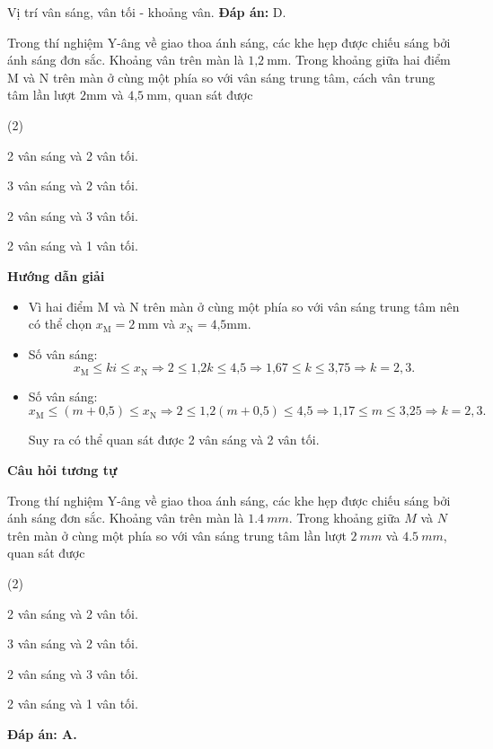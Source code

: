 \begin{dang}{Vị trí vân sáng, vân tối - khoảng vân.}
{	
	\textbf{Đáp án:} D.
	}

	{
		Trong thí nghiệm Y-âng về giao thoa ánh sáng, các khe hẹp được chiếu sáng bởi ánh sáng đơn sắc. Khoảng vân trên màn là $\text{1,2}\ \text{mm}$. Trong khoảng giữa hai điểm M và N trên màn ở cùng một phía so với vân sáng trung tâm, cách vân trung tâm lần lượt $2 \text{mm}$ và $\text{4,5}\ \text{mm}$, quan sát được
		\begin{mcq}(2)
			\item 2 vân sáng và 2 vân tối.		
			\item 3 vân sáng và 2 vân tối.
			\item 2 vân sáng và 3 vân tối.		
			\item 2 vân sáng và 1 vân tối.
		\end{mcq}
	}
	{
		\begin{center}
			\textbf{Hướng dẫn giải}
		\end{center}
		
		\begin{itemize}
			
			\item Vì hai điểm M và N trên màn ở cùng một phía so với vân sáng trung tâm nên có thể chọn $x_{\text{M}}= 2\ \text{mm}$ và $x_{\text{N}}= \text{4,5} \text{mm}$.
			
			\item Số vân sáng:
			\begin{equation*}
			x_{\text{M}} \leq  ki \leq x_{\text{N}} \Rightarrow 2 \leq \text{1,2} k \leq \text{4,5} \Rightarrow \text{1,67}  \leq k \leq \text{3,75} \Rightarrow k = 2, 3. 
			\end{equation*}
			\item Số vân sáng:
			\begin{equation*}
			x_{\text{M}} \leq  (m+\text{0,5}) \leq x_{\text{N}} \Rightarrow 2 \leq \text{1,2} (m+\text{0,5}) \leq \text{4,5} \Rightarrow \text{1,17}  \leq m \leq \text{3,25} \Rightarrow k = 2, 3. 
			\end{equation*}
			
			Suy ra có thể quan sát được 2 vân sáng và 2 vân tối.
		\end{itemize}		
		
		\begin{center}
			\textbf{Câu hỏi tương tự}
		\end{center}
		
Trong thí nghiệm Y-âng về giao thoa ánh sáng, các khe hẹp được chiếu sáng bởi ánh sáng đơn sắc. Khoảng vân trên màn là $ \SI{1,4}{mm} $. Trong khoảng giữa $ M $ và $ N $ trên màn ở cùng một phía so với vân sáng trung tâm lần lượt $ \SI{2}{mm} $ và $ \SI{4,5}{mm} $, quan sát được	
\begin{mcq}(2)
			\item 2 vân sáng và 2 vân tối.		
			\item 3 vân sáng và 2 vân tối.
			\item 2 vân sáng và 3 vân tối.		
			\item 2 vân sáng và 1 vân tối.
		\end{mcq}	
		\textbf{Đáp án: A.}
	}
\end{dang}

